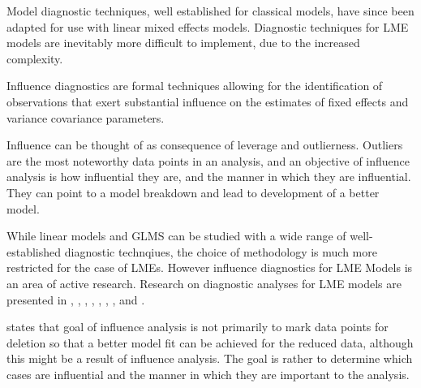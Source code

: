 \documentclass[12pt, a4paper]{report}
\theoremstyle{definition}
\theoremstyle{remark}
\begin{document}
Model diagnostic techniques, well established for classical models, have since been adapted for use with linear mixed effects models. Diagnostic techniques for LME models are inevitably more difficult to implement, due to the increased complexity.

Influence diagnostics are formal techniques allowing for the identification of observations that exert substantial  influence on the estimates of fixed effects and variance covariance parameters.

Influence can be thought of as consequence of leverage and outlierness. Outliers are the most noteworthy data points in an analysis, and an objective of influence analysis is how influential they are, and the manner in which they are influential. They can point to a model breakdown and lead to development of a better model.

While linear models and GLMS can be studied with a wide range of well-established diagnostic technqiues, the choice of methodology is much more restricted for the case of LMEs. However
influence diagnostics for LME Models is an area of active research. Research on diagnostic analyses for LME models are presented in \citet{Beckman}, 
\citet{Christensen}, \citet{Hilden1995}, \citet{lesaffre1998local}, \citet{Banerjee1997}, 
\citet{fung2002}, \citet{Demi}, \citet{Zewotir} and \citet{NobreSinger2007, NobreSinger2011}.





\citet{schabenberger} states that goal of influence analysis is not primarily to mark data
points for deletion so that a better model fit can be achieved for the reduced data, although this might be a
result of influence analysis. The goal is rather to determine which cases are influential and the manner in
which they are important to the analysis. 




%
\end{document}
